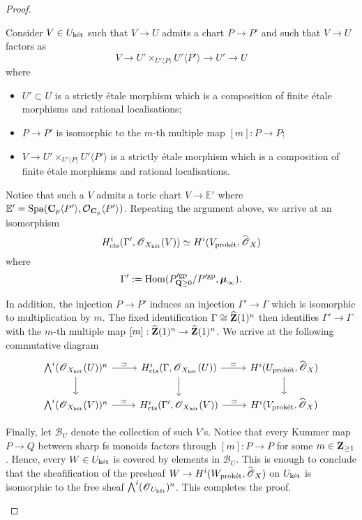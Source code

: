 \begin{proof}
\begin{enumerate}
Consider $V\in U_{\operatorname{\textrm{k\'{e}t}}}$ such that $V\rightarrow U$ admits a chart $P\rightarrow P'$ and such that $V\rightarrow U$ factors as 
$$V\rightarrow U'\times_{U'\langle P\rangle}U'\langle P'\rangle \rightarrow U' \rightarrow U$$
where 
\begin{itemize}
\item $U'\subset U$ is a strictly \'etale morphism which is a composition of finite \'etale morphisms and rational localisations;
\item $P\rightarrow P'$ is isomorphic to the $m$-th multiple map $[m]: P\rightarrow P$;
\item $V\rightarrow U'\times_{U'\langle P\rangle}U'\langle P'\rangle$ is a strictly \'etale morphism which is a composition of finite \'etale morphisms and rational localisations.
\end{itemize}

Notice that such a $V$ admits a toric chart $V\rightarrow \mathbb{E}'$ where $\mathbb{E}'=\operatorname{Spa}(\operatorname{\mathbf{C}}_p\langle P'\rangle, \operatorname{\mathcal{O}}_{\operatorname{\mathbf{C}}_p}\langle P'\rangle)$. Repeating the argument above, we arrive at an isomorphism
$$H^i_{\operatorname{cts}}(\Gamma', \operatorname{\mathscr{O}}_{X_{\operatorname{\textrm{k\'{e}t}}}}(V))\simeq H^i(V_{\operatorname{\textrm{prok\'{e}t}}}, \widehat{\operatorname{\mathscr{O}}}_X)$$
where 
$$\Gamma':= \operatorname{Hom} (P'^{\mathrm{gp}}_{\operatorname{\mathbf{Q}}\geq 0}/P'^{\mathrm{gp}}, \boldsymbol{\mu}_{\infty}).$$

In addition, the injection $P\rightarrow P'$ induces an injection $\Gamma'\rightarrow \Gamma$ which is isomorphic to multiplication by $m$. The fixed identification $\Gamma\cong \widehat{\operatorname{\mathbf{Z}}}(1)^n$ then identifies $\Gamma'\rightarrow \Gamma$ with the $m$-th multiple map $[m]: \widehat{\operatorname{\mathbf{Z}}}(1)^n\rightarrow \widehat{\operatorname{\mathbf{Z}}}(1)^n$. We arrive at the following commutative diagram
$$\begin{tikzcd}
\bigwedge^i(\scrO_{X_{\ket}}(U))^n \arrow[d] \arrow[r, "\simeq"] & H^i_{\cts}(\Gamma, \scrO_{X_{\ket}}(U))\arrow[d] \arrow[r, "\simeq"] &H^i(U_{\proket}, \widehat{\scrO}_X) \arrow[d]
\\
\bigwedge^i(\scrO_{X_{\ket}}(V))^n \arrow[r, "\simeq"] & H^i_{\cts}(\Gamma', \scrO_{X_{\ket}}(V))\arrow[r, "\simeq"] &H^i(V_{\proket}, \widehat{\scrO}_X)
 \end{tikzcd}$$
 
Finally, let $\mathcal{B}_U$ denote the collection of such $V$'s. Notice that every Kummer map $P\rightarrow Q$ between sharp fs monoids factors through $[m]:P\rightarrow P$ for some $m\in \operatorname{\mathbf{Z}}_{\geq 1}$. Hence, every $W\in U_{\operatorname{\textrm{k\'{e}t}}}$ is covered by elements in $\mathcal{B}_U$. This is enough to conclude that the sheafification of the presheaf $W\rightarrow H^i(W_{\operatorname{\textrm{prok\'{e}t}}}, \widehat{\operatorname{\mathscr{O}}}_X)$ on $U_{\operatorname{\textrm{k\'{e}t}}}$ is isomorphic to the free sheaf $\bigwedge^i(\operatorname{\mathscr{O}}_{U_{\operatorname{\textrm{k\'{e}t}}}})^n$. This completes the proof. 
\end{enumerate}
\end{proof}

